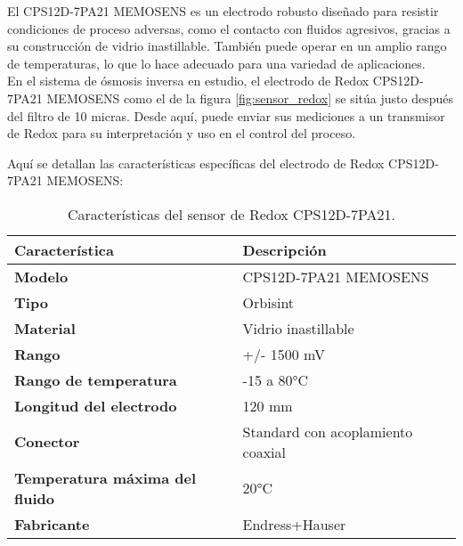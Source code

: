 El CPS12D-7PA21 MEMOSENS es un electrodo robusto diseñado para resistir condiciones de proceso adversas, como el contacto con fluidos agresivos, gracias a su construcción de vidrio inastillable. También puede operar en un amplio rango de temperaturas, lo que lo hace adecuado para una variedad de aplicaciones.\\

En el sistema de ósmosis inversa en estudio, el electrodo de Redox CPS12D-7PA21 MEMOSENS como el de la figura \ref{fig:sensor_redox} se sitúa justo después del filtro de 10 micras. Desde aquí, puede enviar sus mediciones a un transmisor de Redox para su interpretación y uso en el control del proceso.\\



Aquí se detallan las características específicas del electrodo de Redox CPS12D-7PA21 MEMOSENS:\\

\begin{table}[H]
    \centering
    \caption{Características del sensor de Redox CPS12D-7PA21.}
    \label{table:sensor_redox}
    \begin{tabular}{| L{6cm} | L{6cm} |}
        \hline
        \textbf{Característica} & \textbf{Descripción}  \\
        \hline
        \textbf{Modelo} & CPS12D-7PA21 MEMOSENS  \\
        \hline
        \textbf{Tipo} & Orbisint  \\
        \hline
        \textbf{Material} & Vidrio inastillable  \\
        \hline
        \textbf{Rango} & +/- 1500 mV  \\
        \hline
        \textbf{Rango de temperatura} & -15 a 80°C  \\
        \hline
        \textbf{Longitud del electrodo} & 120 mm  \\
        \hline
        \textbf{Conector} & Standard con acoplamiento coaxial  \\
        \hline
        \textbf{Temperatura máxima del fluido} & 20°C  \\
        \hline
        \textbf{Fabricante} & Endress+Hauser  \\
        \hline
    \end{tabular}
\end{table}


